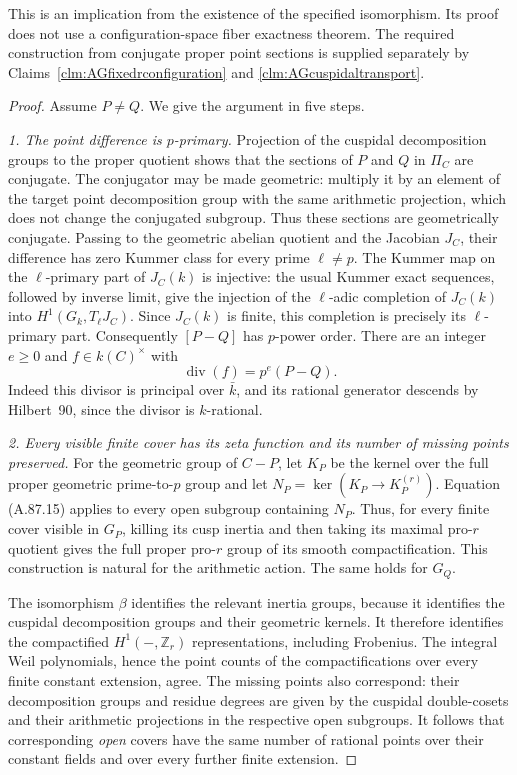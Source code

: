 \documentclass[11pt]{article}
\begin{document}
This is an implication from the existence of the specified
isomorphism. Its proof does not use a configuration-space
fiber exactness theorem. The required construction from
conjugate proper point sections is supplied separately by
Claims~\ref{clm:AGfixedrconfiguration} and
\ref{clm:AGcuspidaltransport}.

\begin{proof}
Assume \(P\ne Q\). We give the argument in five steps.

\emph{1. The point difference is \(p\)-primary.}
Projection of the cuspidal decomposition groups to the
proper quotient shows that the sections of \(P\) and
\(Q\) in \(\Pi_C\) are conjugate. The conjugator
may be made geometric: multiply it by an element of
the target point decomposition group with the same
arithmetic projection, which does not change the
conjugated subgroup. Thus these sections are
geometrically conjugate. Passing
to the geometric abelian quotient and the Jacobian
\(J_C\), their difference has zero Kummer class for
every prime \(\ell\ne p\). The Kummer map on the
\(\ell\)-primary part of \(J_C(k)\) is injective:
the usual Kummer exact sequences, followed by inverse
limit, give the injection of the \(\ell\)-adic
completion of \(J_C(k)\) into
\(H^1(G_k,T_\ell J_C)\). Since \(J_C(k)\) is finite,
this completion is precisely its \(\ell\)-primary part.
Consequently \([P-Q]\) has \(p\)-power order. There are
an integer \(e\geq0\) and \(f\in k(C)^\times\) with
\[
                  \operatorname{div}(f)=p^e(P-Q).
                                                        \tag{A.88.1}
\]
Indeed this divisor is principal over \(\bar k\), and
its rational generator descends by Hilbert~90, since
the divisor is \(k\)-rational.

\emph{2. Every visible finite cover has its zeta function
and its number of missing points preserved.}
For the geometric group of \(C-P\), let \(K_P\) be
the kernel over the full proper geometric prime-to-\(p\)
group and let \(N_P=\ker(K_P\to K_P^{(r)})\).
Equation (A.87.15) applies to every open subgroup
containing \(N_P\). Thus, for every finite cover
visible in \(G_P\), killing its cusp inertia and then
taking its maximal pro-\(r\) quotient gives the full
proper pro-\(r\) group of its smooth compactification.
This construction is natural for the arithmetic action.
The same holds for \(G_Q\).

The isomorphism \(\beta\) identifies the relevant
inertia groups, because it identifies the cuspidal
decomposition groups and their geometric kernels.
It therefore identifies the compactified
\(H^1(-,\mathbb Z_r)\) representations, including
Frobenius. The integral Weil polynomials, hence the
point counts of the compactifications over every
finite constant extension, agree. The missing points
also correspond: their decomposition groups and
residue degrees are given by the cuspidal
double-cosets and their arithmetic projections in
the respective open subgroups. It follows that
corresponding \emph{open} covers have the same
number of rational points over their constant
fields and over every further finite extension.


\end{proof}
\end{document}
